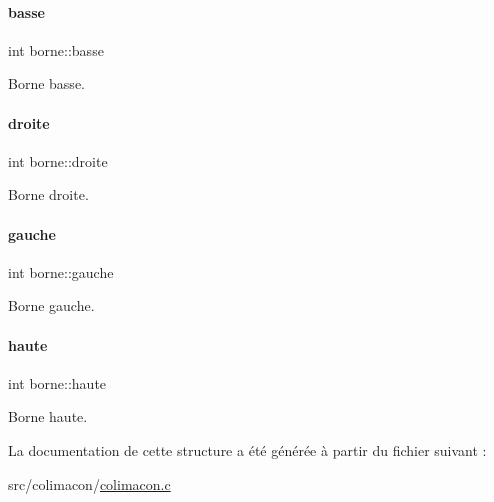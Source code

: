 \paragraph{\texorpdfstring{basse}{basse}}
{\footnotesize\ttfamily int borne\+::basse}



Borne basse. 

\mbox{\label{structborne_a04125ed007cc8fae491652a12105a146}} 
\paragraph{\texorpdfstring{droite}{droite}}
{\footnotesize\ttfamily int borne\+::droite}



Borne droite. 

\mbox{\label{structborne_a86d2017d73ee98af609c4ffeaef58643}} 
\paragraph{\texorpdfstring{gauche}{gauche}}
{\footnotesize\ttfamily int borne\+::gauche}



Borne gauche. 

\mbox{\label{structborne_a9bcfad7d4fb8ced90f1035b520cb6cd8}} 
\paragraph{\texorpdfstring{haute}{haute}}
{\footnotesize\ttfamily int borne\+::haute}



Borne haute. 



La documentation de cette structure a été générée à partir du fichier suivant \+:\begin{DoxyCompactItemize}
\item 
src/colimacon/\hyperlink{colimacon_8c}{colimacon.\+c}\end{DoxyCompactItemize}
